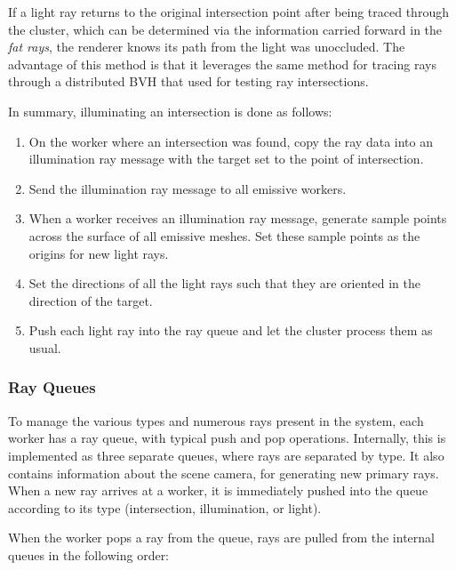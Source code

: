 \documentclass[a4paper,twoside]{article}
\begin{document}
If a light ray returns to the original intersection point after being
traced through the cluster, which can be determined via the information carried
forward in the 
\emph{fat rays}, the renderer knows its path from the light was unoccluded.
The advantage of this method is that it leverages the same method for tracing rays through a distributed BVH that
used for testing ray intersections. 


In summary, illuminating an intersection is done as follows:

\begin{enumerate}
    \item On the worker where an intersection was found, copy the ray data into
        an illumination ray message with the target set to the point of
        intersection.
    \item Send the illumination ray message to all emissive workers.
    \item When a worker receives an illumination ray message, generate sample
        points across the surface of all emissive meshes. Set these sample
        points as the origins for new light rays.
    \item Set the directions of all the light rays such that they are oriented
        in the direction of the target.
    \item Push each light ray into the ray queue and let the cluster process
        them as usual.
\end{enumerate}


\subsubsection {Ray Queues}
\label{queues}

To manage the various types and numerous rays present in the system, 
each worker has a ray queue, with typical push and pop operations. Internally,
this is implemented as three separate queues, where rays are separated by type.
It also contains information about the scene camera, for generating new primary
rays. When a new ray arrives at a worker, it is immediately pushed into the queue
according to its type (intersection, illumination, or light).

When the worker pops a ray from the queue, rays are pulled from the internal
queues in the following order:
\end{document}
